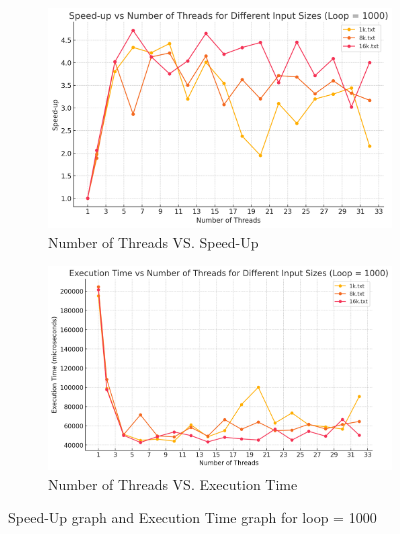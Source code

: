 \documentclass[letterpaper,12pt]{article}
\theoremstyle{remark}
\begin{document}
\begin{figure}[H]
    \centering
    \begin{subfigure}[t]{0.48\textwidth}  %
        \centering
        \includegraphics[width=\textwidth]{codioLoop1000.png}
        \caption{Number of Threads VS. Speed-Up}
        \label{fig:ThreadVsSpeedUp1}
    \end{subfigure}
    \hfill  %
    \begin{subfigure}[t]{0.48\textwidth}  %
        \centering
        \includegraphics[width=\textwidth]{codioExecutionTimeLoop1000.png}
        \caption{Number of Threads VS. Execution Time}
        \label{fig:ThreadVsExecutionTime}
    \end{subfigure}
    \caption{Speed-Up graph and Execution Time graph for loop = 1000}
    \label{fig:ThreadVsComparison}
\end{figure}
\hfill  %
\end{document}
